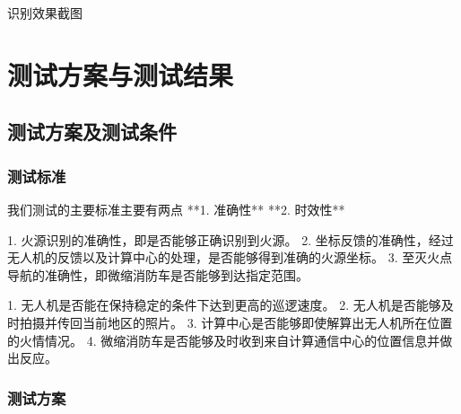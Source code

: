 \documentclass[12pt, a4paper, oneside]{article}
\begin{document}
\begin{figure}[H]
    \centering
\end{figure}

识别效果截图

\section{测试方案与测试结果}

\subsection{测试方案及测试条件}

\subsubsection{测试标准}

我们测试的主要标准主要有两点 **1. 准确性** **2. 时效性**


1. 火源识别的准确性，即是否能够正确识别到火源。
2. 坐标反馈的准确性，经过无人机的反馈以及计算中心的处理，是否能够得到准确的火源坐标。
3. 至灭火点导航的准确性，即微缩消防车是否能够到达指定范围。


1. 无人机是否能在保持稳定的条件下达到更高的巡逻速度。
2. 无人机是否能够及时拍摄并传回当前地区的照片。
3. 计算中心是否能够即使解算出无人机所在位置的火情情况。
4. 微缩消防车是否能够及时收到来自计算通信中心的位置信息并做出反应。

\subsubsection{测试方案}
\end{document}
